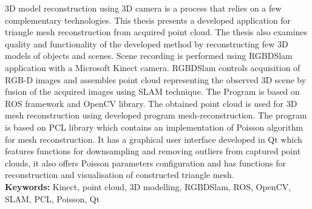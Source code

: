 3D model reconstruction using 3D camera is a process that relies on a
few complementary technologies. This thesis presents a developed
application for triangle mesh reconstruction from acquired point cloud.
The thesis also examines quality and functionality of the developed
method by reconstructing few 3D models of objects and scenes. Scene
recording is performed using RGBDSlam application with a Microsoft
Kinect camera.  RGBDSlam controls acquisition of RGB-D images and
assembles point cloud representing the observed 3D scene by fusion of
the acquired images using SLAM technique. The Program is based on ROS
framework and OpenCV library. The obtained point cloud is used for 3D
mesh reconstruction using developed program mesh-reconstruction.  The
program is based on PCL library which contains an implementation of
Poisson algorithm for mesh reconstruction. It has a graphical user
interface developed in Qt which features functions for downsampling and
removing outliers from captured point clouds, it also offers Poisson
parameters configuration and has functions for reconstruction and
visualisation of constructed triangle mesh.  \\

\noindent\textbf{Keywords:} Kinect, point cloud, 3D modelling, RGBDSlam,
ROS, OpenCV, SLAM, PCL, Poisson, Qt

